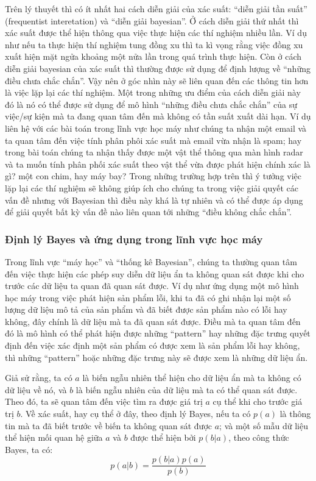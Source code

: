         Trên lý thuyết thì có ít nhất hai cách diễn giải của xác suất: ``diễn giải tần suất'' (frequentist interetation) và ``diễn giải bayesian''. Ở cách diễn giải thứ nhất thì xác suất được thể hiện thông qua việc thực hiện các thí nghiệm nhiều lần. Ví dụ như nếu ta thực hiện thí nghiệm tung đồng xu thì ta kì vọng rằng việc đồng xu xuất hiện mặt ngửa khoảng một nửa lần trong quá trình thực hiện. Còn ở cách diễn giải bayesian của xác suất thì thường được sử dụng để định lượng về ``những điều chưa chắc chắn''. Vậy nên ở góc nhìn này sẽ liên quan đến các thông tin hơn là việc lặp lại các thí nghiệm. Một trong những ưu điểm của cách diễn giải này đó là nó có thể được sử dụng để mô hình ``những điều chưa chắc chắn'' của sự việc/sự kiện mà ta đang quan tâm đến mà không có tần suất xuất dài hạn. Ví dụ liên hệ với các bài toán trong lĩnh vực học máy như chúng ta nhận một email và ta quan tâm đến việc tính phân phôi xác suất mà email vừa nhận là spam; hay trong bài toán chúng ta nhận thấy được một vật thể thông qua màn hình radar và ta muốn tính phân phối xác suất theo vật thể vừa được phát hiện chính xác là gì? một con chim, hay máy bay? Trong những trường hợp trên thì ý tưởng việc lặp lại các thí nghiệm sẽ không giúp ích cho chúng ta trong việc giải quyết các vấn đề nhưng với Bayesian thì điều này khá là tự nhiên và có thể được áp dụng để giải quyết bất kỳ vấn đề nào liên quan tới những ``điều không chắc chắn''.
        
        \subsubsection{Định lý Bayes và ứng dụng trong lĩnh vực học máy}
        Trong lĩnh vực ``máy học'' và ``thống kê Bayesian'', chúng ta thường quan tâm đến việc thực hiện các phép suy diễn dữ liệu ẩn ta không quan sát được khi cho trước các dữ liệu ta quan đã quan sát được.
        Ví dụ như ứng dụng một mô hình học máy trong việc phát hiện sản phẩm lỗi, khi ta đã có ghi nhận lại một số lượng dữ liệu mô tả của sản phẩm và đã biết được sản phẩm nào có lỗi hay không, đây chính là dữ liệu mà ta đã quan sát được. Điều mà ta quan tâm đến đó là mô hình có thể phát hiện được những ``pattern'' hay những đặc trưng quyết định đến việc xác định một sản phẩm có được xem là sản phẩm lỗi hay không, thì những ``pattern'' hoặc những đặc trưng này sẽ được xem là những dữ liệu ẩn.

        Giả sử rằng, ta có $a$ là biến ngẫu nhiên thể hiện cho dữ liệu ẩn mà ta không có dữ liệu về nó, và $b$ là biến ngẫu nhiên của dữ liệu mà ta có thể quan sát được.
        Theo đó, ta sẽ quan tâm đến việc tìm ra được giá trị $a$ cụ thể khi cho trước giá trị $b$. 
        Về xác suất, hay cụ thể ở đây, theo định lý Bayes, nếu ta có $p(a)$ là thông tin mà ta đã biết trước về biến ta không quan sát được $a$; và một số mẫu dữ liệu thể hiện mối quan hệ giữa $a$ và $b$ được thể hiện bởi $p(b|a)$, theo công thức Bayes, ta có:
        \begin{equation}
            \label{equal_bayes}
            p(a|b) = \frac{p(b|a)p(a)}{p(b)}
        \end{equation}

